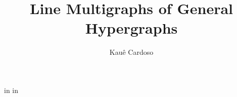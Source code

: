 \documentclass[12pt,reqno]{amsart}
\begin{document}
\title{Line Multigraphs of General Hypergraphs}
 	
\author[K. Cardoso]{Kau\^e Cardoso} \address{Instituto Federal do Rio Grande do Sul - Campus Feliz, Feliz, RS, Brazil.}
 		


 in  in
		
	

\newcommand{\h}{\mathcal{H}}
\newcommand{\g}{\mathcal{G}}
\newcommand{\A}{\mathbf{A}}
\newcommand{\B}{\mathbf{B}}
\newcommand{\C}{\mathbf{C}}
\newcommand{\D}{\mathbf{D}}
\newcommand{\M}{\mathbf{M}}
\newcommand{\N}{\mathbf{N}}
\newcommand{\lin}{\mathcal{L}}
\newcommand{\cli}{\mathcal{C}}
\newcommand{\Q}{\mathbf{Q}}
\newcommand{\x}{\mathbf{x}}
\newcommand{\y}{\mathbf{y}}
\newcommand{\z}{\mathbf{z}}
\newcommand{\E}{\mathtt{E}}
\newcommand{\Ah}{\mathbf{A}(\mathcal{H})}

\theoremstyle{plain}
\newtheorem{theorem}{Theorem}[section]
\newtheorem{lemma}[theorem]{Lemma}
\newtheorem{proposition}[theorem]{Proposition}
\newtheorem{corollary}[theorem]{Corollary}

\theoremstyle{definition}
\newtheorem{definition}[theorem]{Definition}
\newtheorem{claim}[theorem]{Claim}
\newtheorem{question}[theorem]{Question}
\newtheorem{example}[theorem]{Example}
\newtheorem{remark}[theorem]{Remark}

\newcommand{\keyword}[1]{\textsf{#1}}
\end{document}

